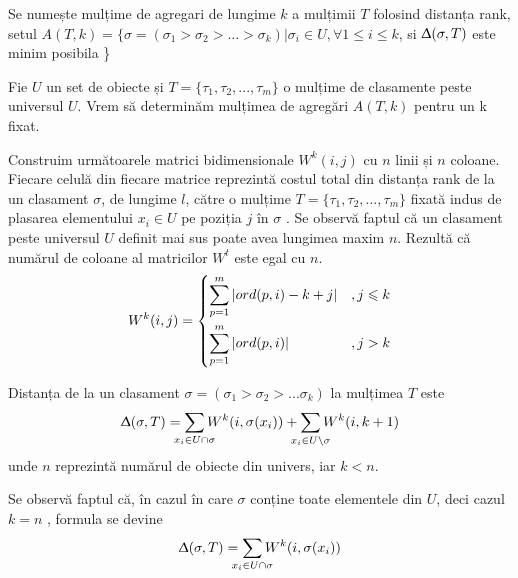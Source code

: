 \begin{definition}
\label{def:Aset}
Se numește mulțime de agregari de lungime $k$ a mulțimii $T$ folosind distanța rank, setul
$
  A(T, k) = \{\sigma=(\sigma_1 > \sigma_2 > ... > \sigma_k) | \sigma_i \in U, 
  \forall 1 \leqslant i \leqslant k$, si 
  $\Updelta(\sigma, T)$ este minim posibila \}
\end{definition}


\begin{problem}
Fie $U$ un set de obiecte și $T = \{\tau_1, \tau_2, ..., \tau_m\}$ o mulțime de clasamente peste
universul $U$. Vrem să determinăm mulțimea de agregări $A(T, k)$ pentru un k fixat. 
\end{problem}

Construim următoarele matrici bidimensionale $W^k(i, j)$ cu $n$ linii și $n$ coloane. Fiecare celulă
din fiecare matrice reprezintă costul total din distanța rank de la un clasament $\sigma$, de 
lungime $l$, către o mulțime $T = \{\tau_1, \tau_2, ..., \tau_m\}$ fixată indus de plasarea 
elementului $x_i \in U$ pe poziția $j$ în $\sigma$ \cite{rankaggregationproblem}. Se observă faptul
că un clasament peste universul $U$ definit mai sus poate avea lungimea maxim $n$. Rezultă că 
numărul de coloane al matricilor $W^t$ este egal cu $n$.
\begin{gather}
  \label{eq:wmatrix}
  W^k(i, j) = \begin{dcases}
    \smashoperator{\sum_{p=1}^{m}} | ord(p, i) - k + j |    &, j \leqslant k \\
    \smashoperator{\sum_{p=1}^{m}} | ord(p, i) |            &, j > k
  \end{dcases}
\end{gather}

\begin{remark}
Distanța de la un clasament $\sigma=(\sigma_1 > \sigma_2 > ... \sigma_k)$ la mulțimea $T$ este
\[
  \Updelta(\sigma, T) = \smashoperator{\sum_{x_i \in U \cap \sigma}} W^k(i, \sigma(x_i)) +
      \smashoperator{\sum_{x_i \in U \setminus \sigma}} W^k(i, k + 1)
\]unde $n$ reprezintă numărul de obiecte din univers, iar $k < n$.
\end{remark}
Se observă faptul că, în cazul în care $\sigma$ conține toate elementele din $U$, deci cazul $k = n$
, formula se devine
\begin{gather}
  \label{eq:minimize}
  \Updelta(\sigma, T) = \smashoperator{\sum_{x_i \in U \cap \sigma}} W^k(i, \sigma(x_i))
\end{gather}

